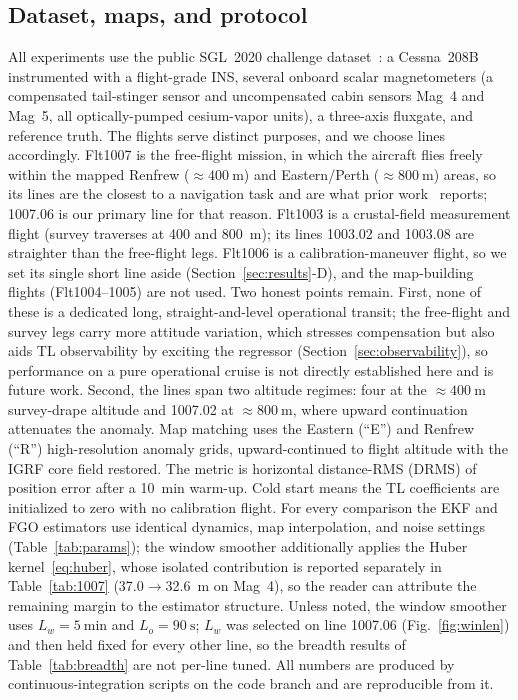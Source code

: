 \documentclass{IEEEtaes}
\begin{document}
\subsection{Dataset, maps, and protocol}
All experiments use the public SGL~2020 challenge dataset~\cite{gnadt2020}: a
Cessna~208B instrumented with a flight-grade INS, several onboard scalar
magnetometers (a compensated tail-stinger sensor and uncompensated cabin sensors
Mag~4 and Mag~5, all optically-pumped cesium-vapor units), a three-axis fluxgate,
and reference truth. The flights serve distinct purposes, and we choose lines
accordingly. Flt1007 is the free-flight mission, in which the aircraft flies freely
within the mapped Renfrew ($\approx\!\SI{400}{\meter}$) and Eastern/Perth
($\approx\!\SI{800}{\meter}$) areas, so its lines are the closest to a navigation
task and are what prior work~\cite{gnadt2020,canciani2017,hager2026} reports;
1007.06 is our primary line for that reason. Flt1003 is a crustal-field
measurement flight (survey traverses at \SI{400}{} and \SI{800}{\meter});
its lines 1003.02 and 1003.08 are straighter than the free-flight legs. Flt1006 is
a calibration-maneuver flight, so we set its single short line aside
(Section~\ref{sec:results}-D), and the map-building flights (Flt1004--1005) are not
used. Two honest points remain. First, none of these is a dedicated long,
straight-and-level operational transit; the free-flight and survey legs carry more
attitude variation, which stresses compensation but also aids TL
observability by exciting the regressor (Section~\ref{sec:observability}), so
performance on a pure operational cruise is not directly established here and is
future work. Second, the lines span two altitude regimes: four at the
$\approx\!\SI{400}{\meter}$ survey-drape altitude and 1007.02 at
$\approx\!\SI{800}{\meter}$, where upward continuation attenuates the anomaly.
Map matching uses the Eastern (``E'') and Renfrew (``R'') high-resolution anomaly
grids, upward-continued to flight altitude with the IGRF core field restored. The
metric is horizontal distance-RMS (DRMS) of position error after a
\SI{10}{\minute} warm-up. Cold
start means the TL coefficients are initialized to zero with no calibration flight.
For every comparison the EKF and FGO estimators use identical dynamics, map
interpolation, and noise settings (Table~\ref{tab:params}); the window smoother
additionally applies the Huber kernel~\eqref{eq:huber}, whose isolated
contribution is reported separately in Table~\ref{tab:1007}
(\SI{37.0}{}$\rightarrow$\SI{32.6}{\meter} on Mag~4), so the reader can attribute
the remaining margin to the estimator structure. Unless noted, the window smoother
uses $L_w=\SI{5}{\minute}$ and $L_o=\SI{90}{\second}$; $L_w$ was selected on line
1007.06 (Fig.~\ref{fig:winlen}) and then held fixed for every other line, so the
breadth results of Table~\ref{tab:breadth} are not per-line tuned. All numbers are
produced by continuous-integration scripts on the code branch and are reproducible
from it.
\end{document}
